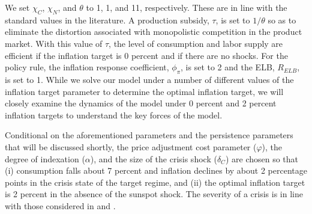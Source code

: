 \documentclass[11pt]{article}
\begin{document}
	We set $\chi_{C}$, $\chi_{N}$, and $\theta$ to 1, 1, and 11, respectively. These are in line with the standard values in the literature. A production subsidy, $\tau$, is set to $1/\theta$ so as to eliminate the distortion associated with monopolistic competition in the product market. With this value of $\tau$, the level of consumption and labor supply are efficient if the inflation target is 0 percent and if there are no shocks. For the policy rule, the inflation response coefficient, $\phi_{\pi}$, is set to 2 and the ELB, $R_{ELB}$, is set to 1. While we solve our model under a number of different values of the inflation target parameter to determine the optimal inflation target, we will closely examine the dynamics of the model under 0 percent and 2 percent inflation targets to understand the key forces of the model.

	Conditional on the aforementioned parameters and the persistence parameters that will be discussed shortly, the price adjustment cost parameter ($\varphi$), the degree of indexation ($\alpha$), and the size of the crisis shock ($\delta_{C}$) are chosen so that (i) consumption falls about 7 percent and inflation declines by about 2 percentage points in the crisis state of the target regime, and (ii) the optimal inflation target is 2 percent in the absence of the sunspot shock. The severity of a crisis is in line with those considered in \citet{BonevaBraunWaki2016} and \citet{HillsNakata2018}.
\end{document}
